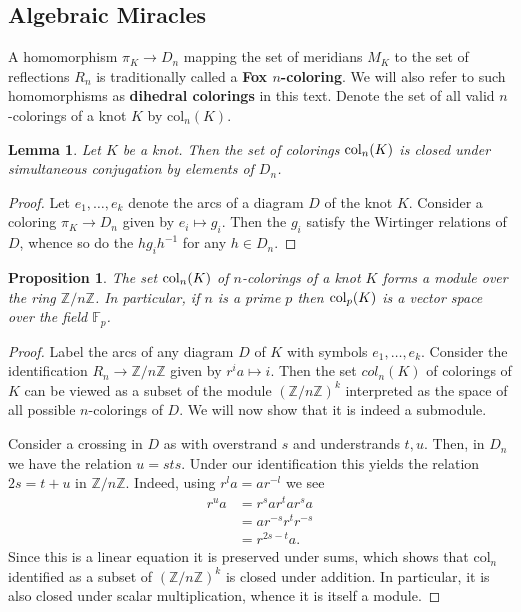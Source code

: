\documentclass{article}
\newtheorem{lemma}[theorem]{Lemma}
\newtheorem{proposition}[theorem]{Proposition}
\theoremstyle{definition}
\begin{document}
\subsection{Algebraic Miracles}\label{sec: miracles}
A homomorphism $\pi_K \rightarrow D_n$ mapping the set of meridians $M_K$ to the set of reflections $R_n$ is traditionally called a \textbf{Fox $n$-coloring}. We will also refer to such homomorphisms as \textbf{dihedral colorings} in this text. Denote the set of all valid $n$-colorings of a knot $K$ by $\text{col}_n(K)$.

\begin{lemma}\label{lem:conjugation-invariance-dihedral}
Let $K$ be a knot. Then the set of colorings $\textup{col}_n(K)$ is closed under simultaneous conjugation by elements of $D_n$.
\end{lemma}

\begin{proof}
Let $e_1, \dots, e_k$ denote the arcs of a diagram $D$ of the knot $K$. Consider a coloring $\pi_K \rightarrow D_n$ given by $e_i \mapsto g_i.$ Then the $g_i$ satisfy the Wirtinger relations of $D$, whence so do the $hg_ih^{-1}$ for any $h \in D_n$.
\end{proof}

\begin{proposition}\label{prop:col-vector-space}
The set $\textup{col}_n(K)$ of $n$-colorings of a knot $K$ forms a module over the ring $\mathbb{Z}/n\mathbb{Z}$. In particular, if $n$ is a prime $p$ then $\textup{col}_p(K)$ is a vector space over the field $\mathbb{F}_p$.
\end{proposition}

\begin{proof}
Label the arcs of any diagram $D$ of $K$ with symbols $e_1, \dots, e_k$. Consider the identification $R_n \rightarrow \mathbb{Z}/n\mathbb{Z}$ given by $r^ia \mapsto i$. Then the set $col_n(K)$ of colorings of $K$ can be viewed as a subset of the module $(\mathbb{Z}/n\mathbb{Z})^k$ interpreted as the space of all possible $n$-colorings of $D$. We will now show that it is indeed a submodule.

Consider a crossing in $D$ as with overstrand $s$ and understrands $t, u$. Then, in $D_n$ we have the relation $u = sts$. Under our identification this yields the relation $2s = t + u$ in $\mathbb{Z}/n\mathbb{Z}$. Indeed, using $r^la = ar^{-l}$ we see
\begin{align*}
r^ua & = r^sar^tar^sa  \\
	 & = ar^{-s}r^tr^{-s} \\
	 & = r^{2s -t}a.
\end{align*}
Since this is a linear equation it is preserved under sums, which shows that $\text{col}_n$ identified as a subset of $(\mathbb{Z}/n\mathbb{Z})^k$ is closed under addition. In particular, it is also closed under scalar multiplication, whence it is itself a module.
\end{proof}
\end{document}
